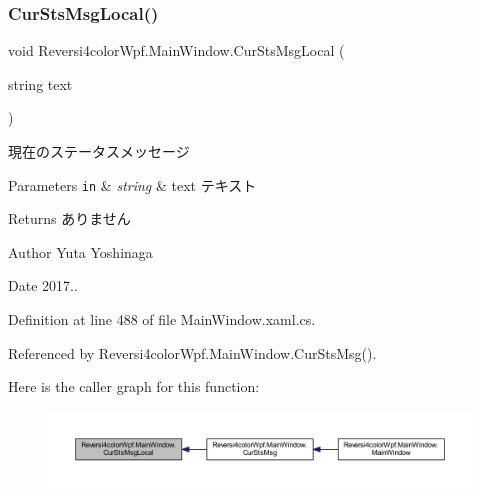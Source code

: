 \subsubsection{\texorpdfstring{Cur\+Sts\+Msg\+Local()}{CurStsMsgLocal()}}
{\footnotesize\ttfamily void Reversi4color\+Wpf.\+Main\+Window.\+Cur\+Sts\+Msg\+Local (\begin{DoxyParamCaption}\item[{string}]{text }\end{DoxyParamCaption})}



現在のステータスメッセージ 


\begin{DoxyParams}[1]{Parameters}
\mbox{\tt in}  & {\em string} & text テキスト \\
\hline
\end{DoxyParams}
\begin{DoxyReturn}{Returns}
ありません 
\end{DoxyReturn}
\begin{DoxyAuthor}{Author}
Yuta Yoshinaga 
\end{DoxyAuthor}
\begin{DoxyDate}{Date}
2017.. 
\end{DoxyDate}


Definition at line 488 of file Main\+Window.\+xaml.\+cs.



Referenced by Reversi4color\+Wpf.\+Main\+Window.\+Cur\+Sts\+Msg().

Here is the caller graph for this function\+:
\nopagebreak
\begin{figure}[H]
\begin{center}
\leavevmode
\includegraphics[width=350pt]{class_reversi4color_wpf_1_1_main_window_a8b1203cb8245c891c935e60a2efead72_icgraph}
\end{center}
\end{figure}
\mbox{\label{class_reversi4color_wpf_1_1_main_window_a423004ac78eb7b105b4cbd4d80a56f15}} 
